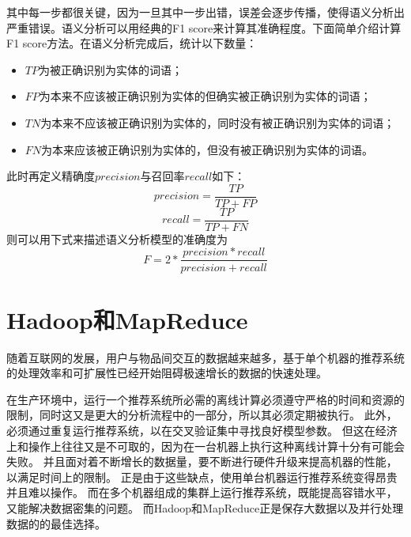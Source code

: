 其中每一步都很关键，因为一旦其中一步出错，误差会逐步传播，使得语义分析出严重错误。语义分析可以用经典的F1 score来计算其准确程度。下面简单介绍计算F1 score方法。在语义分析完成后，统计以下数量：
\begin{center}
\begin{itemize}
	\item $TP$为被正确识别为实体的词语；
	\item $FP$为本来不应该被正确识别为实体的但确实被正确识别为实体的词语；
	\item $TN$为本来不应该被正确识别为实体的，同时没有被正确识别为实体的词语；
	\item $FN$为本来应该被正确识别为实体的，但没有被正确识别为实体的词语。
\end{itemize}
\end{center}
此时再定义精确度$precision$与召回率$recall$如下：
\begin{equation}
precision= \frac{TP}{TP+FP}
\end{equation}
\begin{equation}
recall= \frac{TP}{TP+FN}
\end{equation}
则可以用下式来描述语义分析模型的准确度为
\begin{equation}
F= 2* \frac{precision*recall}{precision+recall}
\end{equation}


\section{Hadoop和MapReduce}
随着互联网的发展，用户与物品间交互的数据越来越多，基于单个机器的推荐系统的处理效率和可扩展性已经开始阻碍极速增长的数据的快速处理。

在生产环境中，运行一个推荐系统所必需的离线计算必须遵守严格的时间和资源的限制，同时这又是更大的分析流程中的一部分，所以其必须定期被执行。
此外，必须通过重复运行推荐系统，以在交叉验证集中寻找良好模型参数。
但这在经济上和操作上往往又是不可取的，因为在一台机器上执行这种离线计算十分有可能会失败。
并且面对着不断增长的数据量，要不断进行硬件升级来提高机器的性能，以满足时间上的限制。
正是由于这些缺点，使用单台机器运行推荐系统变得昂贵并且难以操作。
而在多个机器组成的集群上运行推荐系统，既能提高容错水平，又能解决数据密集的问题。
而Hadoop和MapReduce正是保存大数据以及并行处理数据的的最佳选择。

